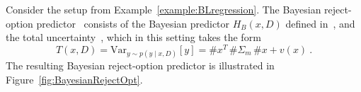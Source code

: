 \begin{example}
\label{example:BayesianRejectOption}
Consider the setup from Example~\ref{example:BLregression}. The Bayesian reject-option predictor~ consists of the Bayesian predictor $H_B(x, D)$ defined in~, and the total uncertainty~, which in this setting takes the form
\begin{equation}
\label{equ:TotalCondRiskLinReg}
  T(x, D) = \mathrm{Var}_{y \sim p(y \mid x, D)}[y] = \#x^T\, \#\Sigma_m\, \#x + v(x) \:.
\end{equation}
%
The resulting Bayesian reject-option predictor is illustrated in 
Figure~\ref{fig:BayesianRejectOpt}.
\end{example}


